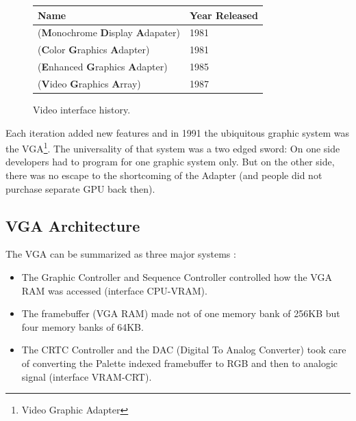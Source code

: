 \documentclass[book.tex]{subfiles}
\begin{document}
 \begin{figure}[H]
\centering  
\begin{tabularx}{\textwidth}{ X  Y }
  \toprule
  \textbf{Name} &  \textbf{Year Released} \\
  \toprule {}
   (\textbf{M}onochrome
   \textbf{D}isplay
   \textbf{A}dapater) & 1981 
   \\ 
   (\textbf{C}olor
   \textbf{G}raphics
   \textbf{A}dapter) & 1981 
    \\ 
   (\textbf{E}nhanced
   \textbf{G}raphics
   \textbf{A}dapter) & 1985
   \\ 
   (\textbf{V}ideo
   \textbf{G}raphics
   \textbf{A}rray)  & 1987
    \\
  \toprule
\end{tabularx}
\caption{Video interface history.}\label{fig:vga_history}
\end{figure}

Each iteration added new features and in 1991 the ubiquitous graphic system was the VGA\footnote{Video Graphic Adapter}. The universality of that system was a two edged sword: On one side developers had to program for one graphic system only. But on the other side, there was no escape to the shortcoming of the Adapter (and people did not purchase separate GPU back then).\\

\subsection{VGA Architecture}

The VGA can be summarized as three major systems :

\begin{itemize}
\item The Graphic Controller and Sequence Controller controlled how the VGA RAM was accessed (interface CPU-VRAM).
\item The framebuffer (VGA RAM) made not of one memory bank of 256KB but four memory banks of 64KB.
\item The CRTC Controller and the DAC (Digital To Analog Converter) took care of converting the Palette indexed framebuffer to RGB and then to analogic signal (interface VRAM-CRT).
\end{itemize}
\end{document}
